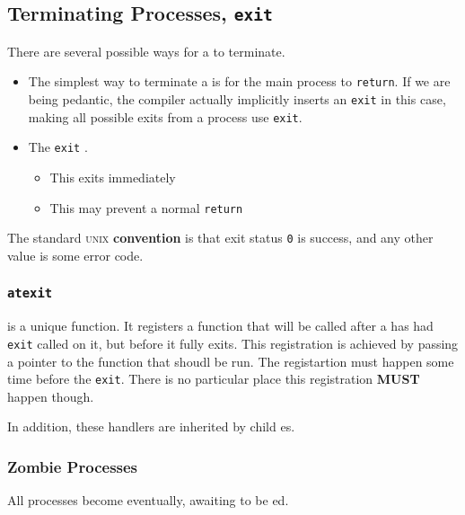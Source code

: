 \subsection{Terminating Processes, \texttt{exit}}\label{subsec:Terminating_Processes-exit}
There are several possible ways for a  to terminate.

\begin{itemize}[noitemsep]
\item The simplest way to terminate a  is for the main process to \texttt{return}.
  If we are being pedantic, the compiler actually implicitly inserts an \texttt{exit} in this case, making all possible exits from a process use \texttt{exit}.

\item The \texttt{exit} .
  \begin{itemize}[noitemsep]
  \item This exits immediately
  \item This may prevent a normal \texttt{return}
  \end{itemize}
\end{itemize}

The standard \textsc{unix} \textbf{convention} is that exit status \texttt{0} is success, and any other value is some error code.

\subsubsection{\texttt{atexit}}\label{subsubsec:atexit}
 is a unique function.
It registers a function that will be called after a  has had \texttt{exit} called on it, but before it fully exits.
This registration is achieved by passing a pointer to the function that shoudl be run.
The registartion must happen some time before the \texttt{exit}.
There is no particular place this registration \textbf{MUST} happen though.

In addition, these handlers are inherited by child es.

\subsubsection{Zombie Processes}\label{subsubsec:Zombie_Processes}
All processes become  eventually, awaiting to be ed.


